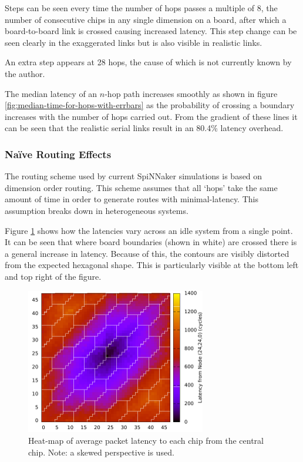 				Steps can be seen every time the number of hops passes a multiple of 8,
				the number of consecutive chips in any single dimension on a board,
				after which a board-to-board link is crossed causing increased latency.
				This step change can be seen clearly in the exaggerated links but is
				also visible in realistic links.
				
				An extra step appears at 28 hops, the cause of which is not currently
				known by the author.
				
				The median latency of an $n$-hop path increases smoothly as shown in
				figure \ref{fig:median-time-for-hops-with-errbars} as the probability of
				crossing a boundary increases with the number of hops carried out. From
				the gradient of these lines it can be seen that the realistic serial links
				result in an 80.4\% latency overhead.
			
			\subsubsection{Na\"ive Routing Effects}
				
				The routing scheme used by current SpiNNaker simulations is based on
				dimension order routing. This scheme assumes that all `hops' take the
				same amount of time in order to generate routes with minimal-latency.
				This assumption breaks down in heterogeneous systems.
				
				Figure \ref{fig:packet-latency-unloaded} shows how the latencies vary
				across an idle system from a single point. It can be seen that where board
				boundaries (shown in white) are crossed there is a general increase in
				latency. Because of this, the contours are visibly distorted from the
				expected hexagonal shape. This is particularly visible at the bottom left
				and top right of the figure.
				
				\begin{figure}
					\centering
					\includegraphics[width=0.7\textwidth]{figures/packet-latency-unloaded.pdf}
					
					\caption[Heat-map of average packet latency.]{Heat-map of average
					packet latency to each chip from the central chip. Note: a skewed
					perspective is used.}
					
					\label{fig:packet-latency-unloaded}
				\end{figure}
				
